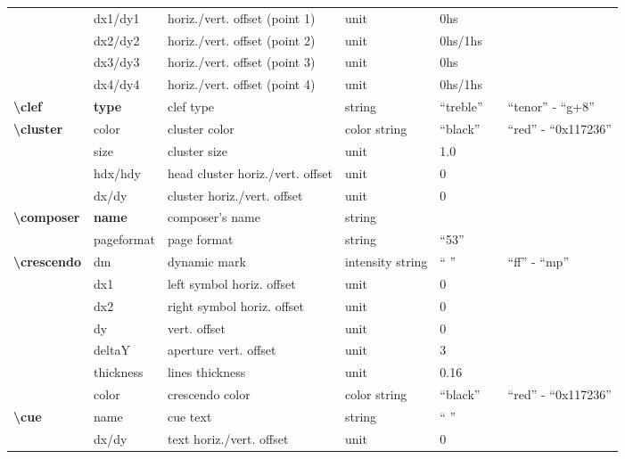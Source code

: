 \documentclass[a4paper, landscape, 10pt]{article}
\begin{document}
\begin{tabularx}{\linewidth}{p{3cm}p{2cm}p{5.5cm}p{2.5cm}p{3.5cm}p{4cm}p{3.5cm}}
    &dx1/dy1&horiz./vert. offset (point 1)&unit&0hs&&\\
    &dx2/dy2&horiz./vert. offset (point 2)&unit&0hs/1hs&&\\
    &dx3/dy3&horiz./vert. offset (point 3)&unit&0hs&&\\
    &dx4/dy4&horiz./vert. offset (point 4)&unit&0hs/1hs&&\\
    \hline
    \textbf{\textbackslash{}clef}&\textbf{type}&clef type&string&``treble''&&``tenor'' - ``g+8''\\
    \hline
    \textbf{\textbackslash{}cluster}&color&cluster color&color string&``black''&&``red'' - ``0x117236''\\
    &size&cluster size&unit&1.0&&\\
    &hdx/hdy&head cluster horiz./vert. offset&unit&0&&\\
    &dx/dy&cluster horiz./vert. offset&unit&0&&\\
    \hline
    \textbf{\textbackslash{}composer}&\textbf{name}&composer's name&string&&&\\
    &pageformat&page format&string&``53''&&\\ %
    \hline
    \textbf{\textbackslash{}crescendo}&dm&dynamic mark&intensity string&`` ''&&``ff'' - ``mp''\\
    &dx1&left symbol horiz. offset&unit&0&&\\
    &dx2&right symbol horiz. offset&unit&0&&\\
    &dy&vert. offset&unit&0&&\\
    &deltaY&aperture vert. offset&unit&3&&\\
    &thickness&lines thickness&unit&0.16&&\\
    &color&crescendo color&color string&``black''&&``red'' - ``0x117236''\\
    \hline
    \textbf{\textbackslash{}cue}&name&cue text&string&`` ''&&\\
    &dx/dy&text horiz./vert. offset&unit&0&&\\
    \hline
\end{tabularx}
\end{document}
